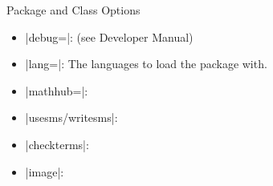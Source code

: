 \documentclass{stex}
\begin{document}
\begin{sfragment}{Package and Class Options}
  
    \begin{itemize}
      \item|debug=|: (see Developer Manual)
      \item|lang=|: The languages to load the 
        package with.
      \item|mathhub=|:
      \item|usesms/writesms|:
      \item|checkterms|:
      \item|image|:
    \end{itemize}

\end{sfragment}
\end{document}
